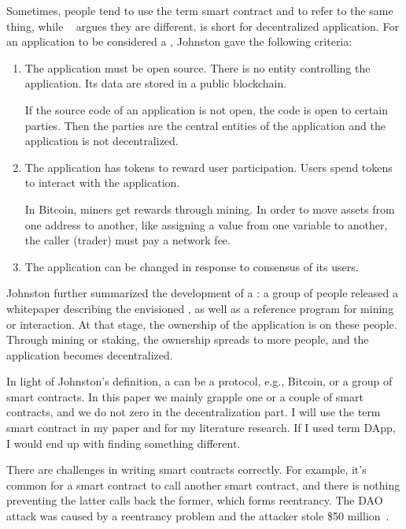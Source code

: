 Sometimes, people tend to use the term smart contract and {\dapp} to refer to the same thing,
while ~\cite{johnston2014general} argues they are different.
{\dapp} is short for decentralized application.
For an application to be considered a {\dapp}, Johnston gave the following criteria:

\begin{enumerate}
\item The application must be open source. There is no entity controlling the application. Its data are stored in a public blockchain.

If the source code of an application is not open, the code is open to certain parties. Then the parties are the central entities of the application and the application is not decentralized.

\item The application has tokens to reward user participation. Users spend tokens to interact with the application.

In Bitcoin, miners get rewards through mining. In order to move assets from one address to another, like assigning a value from one variable to another, the caller (trader) must pay a network fee.

\item The application can be changed in response to consensus of its users.
\end{enumerate}

Johnston further summarized the development of a {\dapp}: a group of people released a whitepaper describing the envisioned {\dapp}, as well as a reference program for mining or interaction. At that stage, the ownership of the application is on these people.
Through mining or staking, the ownership spreads to more people, and the application becomes decentralized.

In light of Johnston's definition, a {\dapp} can be a protocol, e.g., Bitcoin, or a group of smart contracts.
In this paper we mainly grapple one or a couple of smart contracts, and we do not zero in the decentralization part.
I will use the term smart contract in my paper and for my literature research. If I used term DApp, I would end up with finding something different.

There are challenges in writing smart contracts correctly.
For example, it's common for a smart contract to call another smart contract, and there is nothing preventing the latter calls back the former, which forms reentrancy.
The DAO attack was caused by a reentrancy problem and the attacker stole \$50 million~\cite{dao-attack}.


